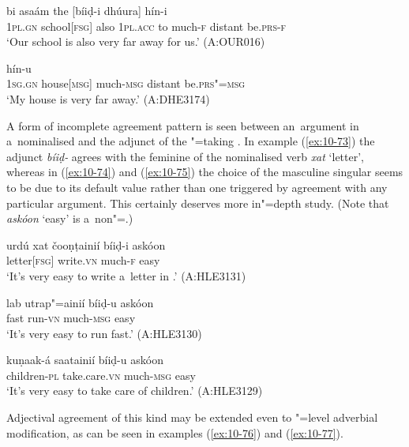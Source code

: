 \begin{exe}
\ex
\label{ex:10-71}
 bi asaám the [bíiḍ-i dhúura] hín-i \\
\textsc{1pl.gn} school[\textsc{fsg}] also \textsc{1pl.acc} to much-\textsc{f} distant be.\textsc{prs-f}  \\
\glt `Our school is also very far away for us.' (A:OUR016)

\ex
\label{ex:10-72}
 hín-u \\
\textsc{1sg.gn} house[\textsc{msg}] much-\textsc{msg} distant be.\textsc{prs"=msg}  \\
\glt `My house is very far away.' (A:DHE3174)
\end{exe}

A form of incomplete agreement pattern is seen between an~argument in a~nominalised  and the adjunct of the "=taking . In example (\ref{ex:10-73}) the adjunct \textit{bíiḍ-} agrees with the feminine  of the nominalised verb \textit{xat} `letter', whereas in (\ref{ex:10-74}) and (\ref{ex:10-75}) the choice of the masculine singular seems to be due to its default value rather than one triggered by agreement with any particular argument. This certainly deserves more in"=depth study. (Note that \textit{askóon} `easy' is a~non"=.)

\begin{exe}
\ex
\label{ex:10-73}
\gll urdú xat čooṇṭainií bíiḍ-i askóon \\
 letter[\textsc{fsg}] write.\textsc{vn} much-\textsc{f} easy  \\
\glt `It's very easy to write a~letter in .' (A:HLE3131)

\ex
\label{ex:10-74}
\gll lab utrap"=ainií bíiḍ-u askóon \\
fast run-\textsc{vn} much-\textsc{msg} easy \\
\glt `It's very easy to run fast.' (A:HLE3130)

\ex
\label{ex:10-75}
\gll kuṇaak-á saatainií bíiḍ-u askóon \\
children-\textsc{pl} take.care.\textsc{vn} much-\textsc{msg} easy \\
\glt `It's very easy to take care of children.' (A:HLE3129)
\end{exe}

Adjectival agreement of this kind may be extended even to "=level adverbial modification, as can be seen in examples (\ref{ex:10-76}) and (\ref{ex:10-77}).

